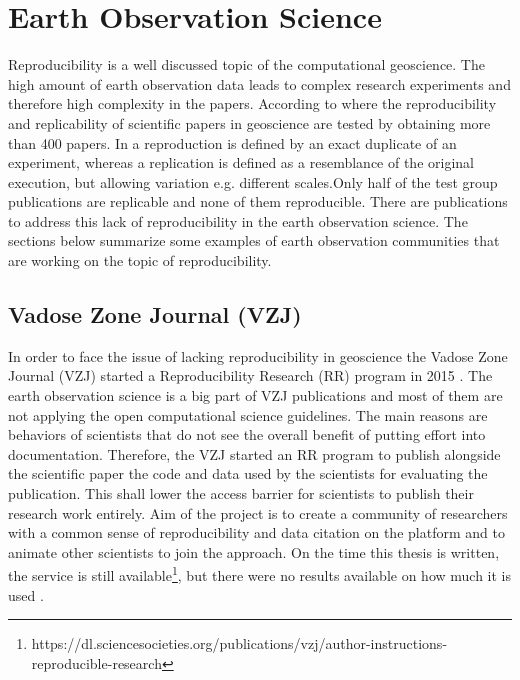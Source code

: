 \documentclass[draft,final]{vutinfth} %
\begin{document}
\section{Earth Observation Science}\label{EOScience}

Reproducibility is a well discussed topic of the computational geoscience. The high amount of earth observation data leads to complex research experiments and therefore high complexity in the papers.  According to \cite{Ostermann2017AdvancingSW} where the reproducibility and replicability of scientific papers in geoscience are tested by obtaining more than 400 papers. In \cite{Ostermann2017AdvancingSW} a reproduction is defined by an exact duplicate of an experiment, whereas a replication is defined as a resemblance of the original execution, but allowing variation e.g. different scales.Only half of the test group publications are replicable and none of them reproducible. There are publications to address this lack of reproducibility in the earth observation science. The sections below summarize some examples of earth observation communities that are working on the topic of reproducibility. 

\subsection{Vadose Zone Journal (VZJ)}\label{VZJ}
In order to face the issue of lacking reproducibility in geoscience the Vadose Zone Journal (VZJ) started a Reproducibility Research (RR) program in 2015 \cite{doi:10.2136/vzj2015.06.0088}. 
The earth observation science is a big part of VZJ publications and most of them are not applying the open computational science guidelines. The main reasons are behaviors of scientists that do not see the overall benefit of putting effort into documentation. Therefore, the VZJ started an RR program to publish alongside the scientific paper the code and data used by the scientists for evaluating the publication. This shall lower the access barrier for scientists to publish their research work entirely. Aim of the project is to create a community of researchers with a common sense of reproducibility and data citation on the platform and to animate other scientists to join the approach. On the time this thesis is written, the service is still available\footnote{https://dl.sciencesocieties.org/publications/vzj/author-instructions-reproducible-research}, but there were no results available on how much it is used \cite{doi:10.2136/vzj2015.06.0088}.
\end{document}
